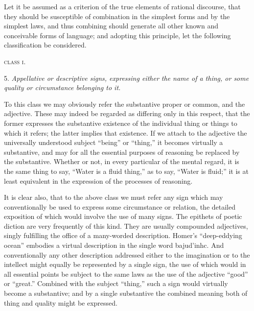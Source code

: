 \documentclass[oneside]{book}
\begin{document}
Let it be assumed as a criterion of the true elements of rational
discourse, that they should be susceptible of combination
in the simplest forms and by the simplest laws, and thus combining
should generate all other known and conceivable forms of
language; and adopting this principle, let the following classification
be considered.

\begin{center}
\textsc{class i}.
\end{center}
5. \textit{Appellative or descriptive signs, expressing either the name
of a thing, or some quality or circumstance belonging to it.}

To this class we may obviously refer the substantive proper
or common, and the adjective. These may indeed be regarded as
differing only in this respect, that the former expresses the substantive
existence of the individual thing or things to which it
refers; the latter implies that existence. If we attach to the
adjective the universally understood subject ``being'' or ``thing,''
it becomes virtually a substantive, and may for all the essential
purposes of reasoning be replaced by the substantive. Whether
or not, in every particular of the mental regard, it is the same
thing to say, ``Water is a fluid thing,'' as to say, ``Water is
fluid;'' it is at least equivalent in the expression of the processes
of reasoning.

It is clear also, that to the above class we must refer any sign
which may conventionally be used to express some circumstance
or relation, the detailed exposition of which would involve the
use of many signs. The epithets of poetic diction are very frequently
of this kind. They are usually compounded adjectives,
singly fulfilling the office of a many-worded description. Homer's
``deep-eddying ocean'' embodies a virtual description in the single
word \textgreek{bajud'inhc}. %
And conventionally any other description addressed
either to the imagination or to the intellect might equally
be represented by a single sign, the use of which would in all essential
points be subject to the same laws as the use of the adjective
``good'' or ``great.'' Combined with the subject ``thing,''
such a sign would virtually become a substantive; and by a single
substantive the combined meaning both of thing and quality
might be expressed.
\end{document}
